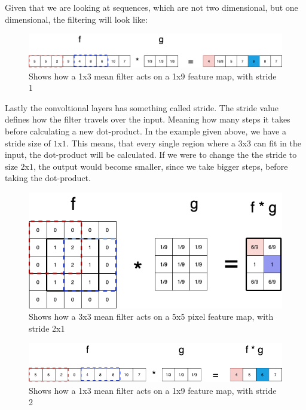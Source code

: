 \noindent
Given that we are looking at sequences, which are not two dimensional, but one dimensional, the filtering will look like:

\begin{figure}[!ht]
  \centering
  \includegraphics[scale=0.4]{latex/IMGs/conv2.png}
  \caption{Shows how a 1x3 mean filter acts on a 1x9 feature map, with stride 1}\label{Baseline:before}
\end{figure}

\noindent
Lastly the convoltional layers has something called stride. The stride value defines how the filter travels over the input. Meaning how many steps it takes before calculating a new dot-product. In the example given above, we have a stride size of $1$x$1$. This means, that every single region where a $3$x$3$ can fit in the input, the dot-product will be calculated. If we were to change the the stride to size $2$x$1$, the output would become smaller, since we take bigger steps, before taking the dot-product.

\begin{figure}[!ht]
  \centering
  \includegraphics[scale=0.4]{latex/IMGs/conv1_stride.png}
  \caption{Shows how a 3x3 mean filter acts on a 5x5 pixel feature map, with stride 2x1}\label{Baseline:before}
\end{figure}

\begin{figure}[!ht]
  \centering
  \includegraphics[scale=0.4]{latex/IMGs/conv2_stride.png}
  \caption{Shows how a 1x3 mean filter acts on a 1x9 feature map, with stride 2}\label{Baseline:before}
\end{figure}




